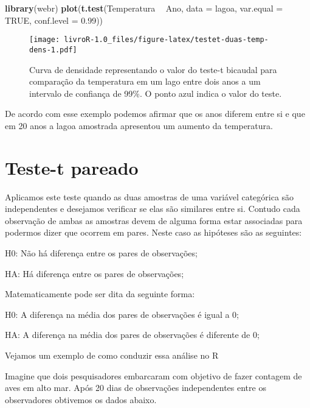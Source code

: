 \documentclass[titlepage, oneside, openany, a4paper]{book}
\newenvironment{Shaded}{\begin{snugshade}}{\end{snugshade}}
\newcommand{\DataTypeTok}[1]{\textcolor[rgb]{0.13,0.29,0.53}{#1}}
\newcommand{\FloatTok}[1]{\textcolor[rgb]{0.00,0.00,0.81}{#1}}
\newcommand{\KeywordTok}[1]{\textcolor[rgb]{0.13,0.29,0.53}{\textbf{#1}}}
\newcommand{\NormalTok}[1]{#1}
\newcommand{\OperatorTok}[1]{\textcolor[rgb]{0.81,0.36,0.00}{\textbf{#1}}}
\newcommand{\OtherTok}[1]{\textcolor[rgb]{0.56,0.35,0.01}{#1}}
\newcommand{\StringTok}[1]{\textcolor[rgb]{0.31,0.60,0.02}{#1}}
\begin{document}
\begin{Shaded}
\begin{Highlighting}[]
\KeywordTok{library}\NormalTok{(webr)}
\KeywordTok{plot}\NormalTok{(}\KeywordTok{t.test}\NormalTok{(Temperatura }\OperatorTok{~}\StringTok{ }\NormalTok{Ano, }
            \DataTypeTok{data =}\NormalTok{ lagoa,}
            \DataTypeTok{var.equal =} \OtherTok{TRUE}\NormalTok{,}
            \DataTypeTok{conf.level =} \FloatTok{0.99}\NormalTok{))}
\end{Highlighting}
\end{Shaded}

\begin{figure}
\centering
\texttt{[image: livroR-1.0\_files/figure-latex/testet-duas-temp-dens-1.pdf]}
\caption{\label{fig:testet-duas-temp-dens}Curva de densidade representando o valor do teste-t bicaudal para comparação da temperatura em um lago entre dois anos a um intervalo de confiança de 99\%. O ponto azul indica o valor do teste.}
\end{figure}

De acordo com esse exemplo podemos afirmar que os anos diferem entre si e que em 20 anos a lagoa amostrada apresentou um aumento da temperatura.

\hypertarget{teste-t-pareado}{%
\section{Teste-t pareado}\label{teste-t-pareado}}

Aplicamos este teste quando as duas amostras de uma variável categórica são independentes e desejamos verificar se elas são similares entre si. Contudo cada observação de ambas as amostras devem de alguma forma estar associadas para podermos dizer que ocorrem em pares. Neste caso as hipóteses são as seguintes:

H0: Não há diferença entre os pares de observações;

HA: Há diferença entre os pares de observações;

Matematicamente pode ser dita da seguinte forma:

H0: A diferença na média dos pares de observações é igual a 0;

HA: A diferença na média dos pares de observações é diferente de 0;

Vejamos um exemplo de como conduzir essa análise no R

Imagine que dois pesquisadores embarcaram com objetivo de fazer contagem de aves em alto mar. Após 20 dias de observações independentes entre os observadores obtivemos os dados abaixo.
\end{document}
